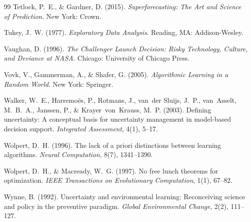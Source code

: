 \documentclass[11pt,a4paper]{article}
\begin{document}
\begin{thebibliography}{99}
Tetlock, P.~E., \& Gardner, D. (2015). \emph{Superforecasting: The Art
and Science of Prediction}. New York: Crown.

Tukey, J.~W. (1977). \emph{Exploratory Data Analysis}. Reading, MA:
Addison-Wesley.

Vaughan, D. (1996). \emph{The Challenger Launch Decision: Risky
Technology, Culture, and Deviance at NASA}. Chicago: University of
Chicago Press.

Vovk, V., Gammerman, A., \& Shafer, G. (2005). \emph{Algorithmic
Learning in a Random World}. New York: Springer.

Walker, W.~E., Harremo\"es, P., Rotmans, J., van~der Sluijs, J.~P.,
van~Asselt, M.~B.~A., Janssen, P., \& Krayer~von~Krauss, M.~P. (2003).
Defining uncertainty: A conceptual basis for uncertainty management in
model-based decision support. \emph{Integrated Assessment}, 4(1), 5--17.

Wolpert, D.~H. (1996). The lack of a priori distinctions between
learning algorithms. \emph{Neural Computation}, 8(7), 1341--1390.

Wolpert, D.~H., \& Macready, W.~G. (1997). No free lunch theorems for
optimization. \emph{IEEE Transactions on Evolutionary Computation},
1(1), 67--82.

Wynne, B. (1992). Uncertainty and environmental learning: Reconceiving
science and policy in the preventive paradigm. \emph{Global
Environmental Change}, 2(2), 111--127.

\end{thebibliography}
\end{document}
